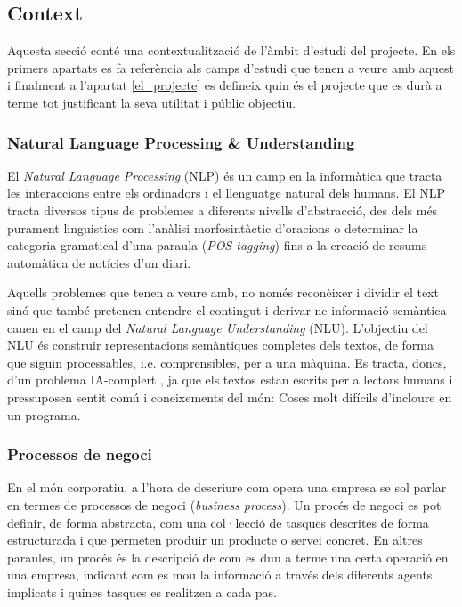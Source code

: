 \documentclass[10pt,a4paper]{article}
\begin{document}
\subsection{Context}

Aquesta secció conté una contextualització de l'àmbit d'estudi del projecte. En els primers apartats es fa referència als camps d'estudi que tenen a veure amb aquest i finalment a l'apartat \ref{el_projecte} es defineix quin és el projecte que es durà a terme tot justificant la seva utilitat i públic objectiu.

\subsubsection{Natural Language Processing \& Understanding}

El \emph{Natural Language Processing} (NLP) és un camp en la informàtica que tracta les interaccions entre els ordinadors i el llenguatge natural dels humans. El NLP tracta diversos tipus de problemes a diferents nivells d'abstracció, des dels més purament linguistics com l'anàlisi morfosintàctic d'oracions o determinar la categoria gramatical d'una paraula (\emph{POS-tagging}) fins a la creació de resums automàtica de notícies d'un diari.

Aquells problemes que tenen a veure amb, no només reconèixer i dividir el text sinó que també pretenen entendre el contingut i derivar-ne informació semàntica cauen en el camp del \emph{Natural Language Understanding} (NLU). L'objectiu del NLU és construir representacions semàntiques completes dels textos, de forma que siguin processables, i.e. comprensibles, per a una màquina. Es tracta, doncs, d'un problema IA-complert \cite[][secció 1]{ai_completeness}, ja que els textos estan escrits per a lectors humans i pressuposen sentit comú i coneixements del món: Coses molt difícils d'incloure en un programa.

\subsubsection{Processos de negoci}

En el món corporatiu, a l'hora de descriure com opera una empresa se sol parlar en termes de processos de negoci (\emph{business process}). Un procés de negoci es pot definir, de forma abstracta, com una col·lecció de tasques descrites de forma estructurada i que permeten produir un producte o servei concret. En altres paraules, un procés és la descripció de com es duu a terme una certa operació en una empresa, indicant com es mou la informació a través dels diferents agents implicats i quines tasques es realitzen a cada pas.
\end{document}
